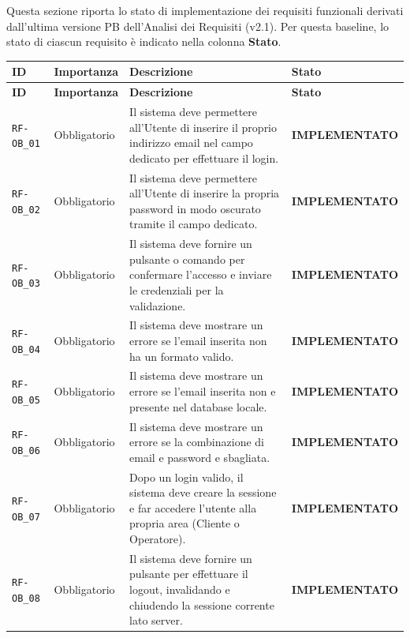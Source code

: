 \documentclass[a4paper, 11pt, oneside]{scrartcl}
\begin{document}
Questa sezione riporta lo stato di implementazione dei requisiti funzionali derivati dall'ultima versione PB dell'Analisi dei Requisiti (v2.1). Per questa baseline, lo stato di ciascun requisito è indicato nella colonna \textbf{Stato}.

\renewcommand{\arraystretch}{1.15}
\begin{longtable}{|>{\raggedright\arraybackslash}p{}|>{\raggedright\arraybackslash}p{}|>{\raggedright\arraybackslash}p{}|>{\raggedright\arraybackslash}p{}|}
    \hline
    \rowcolor[gray]{0.9}
    \textbf{ID} & \textbf{Importanza} & \textbf{Descrizione} & \textbf{Stato} \\
    \hline
    \endfirsthead
    \hline
    \rowcolor[gray]{0.9}
    \textbf{ID} & \textbf{Importanza} & \textbf{Descrizione} & \textbf{Stato} \\
    \hline
    \endhead
    \texttt{RF-OB\_01} & Obbligatorio & Il sistema deve permettere all'Utente di inserire il proprio indirizzo email nel campo dedicato per effettuare il login. & \textbf{IMPLEMENTATO} \\
    \hline
    \texttt{RF-OB\_02} & Obbligatorio & Il sistema deve permettere all'Utente di inserire la propria password in modo oscurato tramite il campo dedicato. & \textbf{IMPLEMENTATO} \\
    \hline
    \texttt{RF-OB\_03} & Obbligatorio & Il sistema deve fornire un pulsante o comando per confermare l'accesso e inviare le credenziali per la validazione. & \textbf{IMPLEMENTATO} \\
    \hline
    \texttt{RF-OB\_04} & Obbligatorio & Il sistema deve mostrare un errore se l'email inserita non ha un formato valido. & \textbf{IMPLEMENTATO} \\
    \hline
    \texttt{RF-OB\_05} & Obbligatorio & Il sistema deve mostrare un errore se l'email inserita non e presente nel database locale. & \textbf{IMPLEMENTATO} \\
    \hline
    \texttt{RF-OB\_06} & Obbligatorio & Il sistema deve mostrare un errore se la combinazione di email e password e sbagliata. & \textbf{IMPLEMENTATO} \\
    \hline
    \texttt{RF-OB\_07} & Obbligatorio & Dopo un login valido, il sistema deve creare la sessione e far accedere l'utente alla propria area (Cliente o Operatore). & \textbf{IMPLEMENTATO} \\
    \hline
    \texttt{RF-OB\_08} & Obbligatorio & Il sistema deve fornire un pulsante per effettuare il logout, invalidando e chiudendo la sessione corrente lato server. & \textbf{IMPLEMENTATO} \\

\end{longtable}
\end{document}
